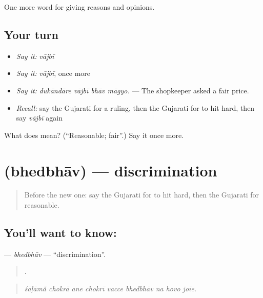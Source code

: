 \begin{grammarlens}[title={What you've built}]
One more word for giving reasons and opinions.
\end{grammarlens}

\subsection*{Your turn}
\begin{itemize}
\raggedright
  \item \emph{Say it:} \emph{vājbī}
  \item \emph{Say it:} \emph{vājbī}, once more
  \item \emph{Say it:} \emph{dukāndāre vājbī bhāv māgyo.} — The shopkeeper asked a fair price.
  \item \emph{Recall:} say the Gujarati for a ruling, then the Gujarati for to hit hard, then say \emph{vājbī} again
\end{itemize}

\begin{tcolorbox}[breakable,colback=teal!4,colframe=teal!35!black,title={Before you move on}]
What does  mean? (\textquotedblleft{}Reasonable; fair\textquotedblright{}.) Say it once more.
\end{tcolorbox}
\section[\texorpdfstring{\gu{ભેદભાવ} (bhedbhāv)}{ભેદભાવ (bhedbhāv)}]{ (bhedbhāv) — discrimination}

\label{lesson:GU-C349-bhedbhav}



\begin{quote}
Before the new one: say the Gujarati for to hit hard, then the Gujarati for reasonable.
\end{quote}

\subsection*{You'll want to know: }
\textbf{} — \emph{bhedbhāv} — \textquotedblleft{}discrimination\textquotedblright{}.

\begin{quote}
        .
\end{quote}

\begin{quote}
\emph{śāḷāmā̃ chokrā ane chokrī vacce bhedbhāv na hovo joīe.}
\end{quote}

